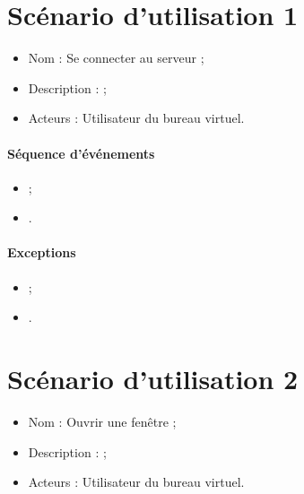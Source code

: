 




\section{Scénario d'utilisation 1}
\begin{itemize}
	\item Nom : Se connecter au serveur ;
	\item Description :  ;
	\item Acteurs : Utilisateur du bureau virtuel.
\end{itemize}

\paragraph{Séquence d'événements}
\begin{itemize}
	\item ;
	\item .
\end{itemize}

\paragraph{Exceptions}
\begin{itemize}
	\item ;
	\item .
\end{itemize}


\section{Scénario d'utilisation 2}
\begin{itemize}
	\item Nom : Ouvrir une fenêtre ;
	\item Description :  ;
	\item Acteurs : Utilisateur du bureau virtuel.
\end{itemize}

